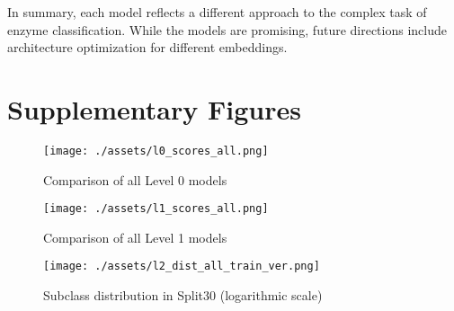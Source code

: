 \documentclass{bioinfo}
\begin{document}
In summary, each model reflects a different approach to the complex task of enzyme classification.
While the models are promising, future directions include architecture optimization for different embeddings.




\section{Supplementary Figures}\label{sec:supplementary figures}
\begin{figure}[!ht]
	\texttt{[image: ./assets/l0\_scores\_all.png]}
	\caption{Comparison of all Level 0 models}
	\label{fig:l0_comp_all}
\end{figure}

\begin{figure}[!ht]
	\texttt{[image: ./assets/l1\_scores\_all.png]}
	\caption{Comparison of all Level 1 models}
	\label{fig:l1_comp_all}
\end{figure}
\begin{figure}[!ht]
\texttt{[image: ./assets/l2\_dist\_all\_train\_ver.png]}
\caption{Subclass distribution in Split30 (logarithmic scale)}\label{fig:l2_dist_train}
\end{figure}

\newpage
\newpage

 

\end{document}
